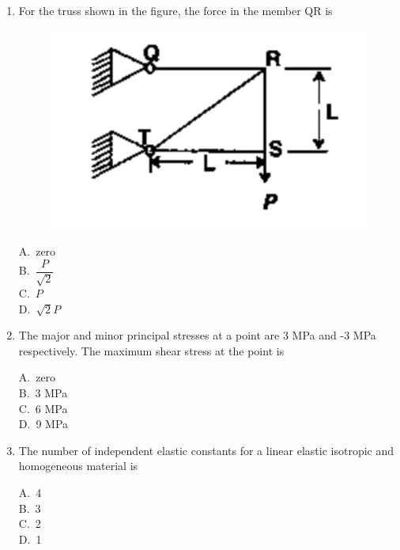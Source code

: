 \documentclass[journal,12pt,onecolumn]{exam}
\theoremstyle{remark}
\begin{document}
\begin{enumerate}
\noindent\item For the truss shown in the figure, the force in the member QR is \hfill{}
\begin{figure}[H]
    \centering
    \includegraphics[scale=0.5]{figs/image1.jpg}
    \caption{}
    \label{fig:figure1}
\end{figure}
\begin{multicols}{4}
A.\ zero \\
B.\ $\dfrac{P}{\sqrt{2}}$ \\
C.\ $P$ \\
D.\ $\sqrt{2}P$
\end{multicols}

\noindent\item The major and minor principal stresses at a point are 3 MPa and -3 MPa respectively. The maximum shear stress at the point is \hfill{}
\begin{multicols}{4}
A.\ zero \\
B.\ 3 MPa \\
C.\ 6 MPa \\
D.\ 9 MPa
\end{multicols}

\noindent\item  The number of independent elastic constants for a linear elastic isotropic and homogeneous material is \hfill{}
\begin{multicols}{4}
A.\ 4 \\
B.\ 3 \\
C.\ 2 \\
D.\ 1
\end{multicols}


\end{enumerate}
\end{document}
